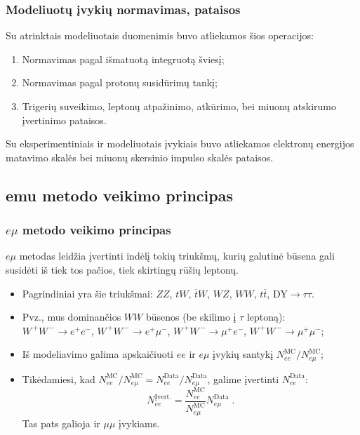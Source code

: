 \documentclass[xcolor=dvipsnames]{beamer}
\newcommand{\emu}{\mathit{e}\mu}
\newcommand{\ee}{\mathit{ee}}
\newcommand{\mumu}{\mu\mu}
\newcommand{\WW}{\mathit{WW}}
\newcommand{\WWpm}{\mathit{W^{\,+}\!W^{\,-}}}
\newcommand{\ZZ}{\mathit{ZZ}}
\newcommand{\DYtau}{\mathrm{DY} \! \rightarrow \! \tau\tau}
\newcommand{\ttbar}{\mathit{t}\overline{\mathit{t}}}
\newcommand{\tbarW}{\overline{\mathit{t}}\mathit{W}}
\newcommand{\tW}{\mathit{tW}}
\newcommand{\MC}{\mathrm{MC}}
\newcommand{\Data}{\mathrm{Data}}
\begin{document}
\begin{frame}
	\frametitle{Modeliuotų įvykių normavimas, pataisos}		
	Su atrinktais modeliuotais duomenimis buvo atliekamos šios operacijos:
	\begin{enumerate}
		\item Normavimas pagal išmatuotą integruotą šviesį;
		\item Normavimas pagal protonų susidūrimų tankį;
		\item Trigerių suveikimo, leptonų atpažinimo, atkūrimo, bei miuonų atskirumo įvertinimo pataisos.
	\end{enumerate}
	Su eksperimentiniais ir modeliuotais įvykiais buvo atliekamos elektronų energijos matavimo skalės bei miuonų skersinio
	impulso skalės pataisos.
\end{frame}

\begin{frame}
	\section{emu metodo veikimo principas}
	\frametitle{$\emu$ metodo veikimo principas}
	\large $\emu$ metodas leidžia įvertinti indėlį tokių triukšmų, kurių galutinė būsena gali susidėti iš tiek tos pačios,
	tiek skirtingų rūšių leptonų.
	\medskip
	\normalsize
	\begin{itemize}
		\item Pagrindiniai yra šie triukšmai: $\ZZ$, $\tW$, $\tbarW$, $WZ$, $\WW$, $\ttbar$, $\DYtau$.
		\bigskip
		\item Pvz., mus dominančios $\WW$ būsenos (be skilimo į $\tau$ leptoną):\\[3mm]
		$\WWpm\!\!\rightarrow\!\mathit{e^{+}\!e^{-}}$, $\WWpm\!\!\rightarrow\!\mathit{e^{+}\!\mu^{-}}$,
		$\WWpm\!\!\rightarrow\!\mathit{\mu^{+}\!e^{-}}$, $\WWpm\!\!\rightarrow\!\mu^{+}\!\mu^{-}$;
		\vspace{0.3cm}
		\item Iš modeliavimo galima apskaičiuoti $\ee$ ir $\emu$ įvykių santykį $\mathit{N}_{\ee}^{\MC}/\mathit{N}_{\emu}^{\MC}$;
		\item Tikėdamiesi, kad $\mathit{N}_{\ee}^{\MC}/\mathit{N}_{\emu}^{\MC}=\mathit{N}_{\ee}^{\Data}/\mathit{N}_{\emu}^{\Data}$,
		galime įvertinti $\mathit{N}_{\ee}^{\Data}$:
		\begin{equation*}
			\mathit{N_{ee}^{\mathrm{Įvert.}}} = \frac{\mathit{N_{ee}^{\mathrm{MC}}}}{\mathit{N_{e\mu}^{\mathrm{MC}}}}
												\mathit{N_{e\mu}^{\mathrm{Data}}} \; .
		\end{equation*}
		Tas pats galioja ir $\mumu$ įvykiams.
	\end{itemize}
\end{frame}
\end{document}
